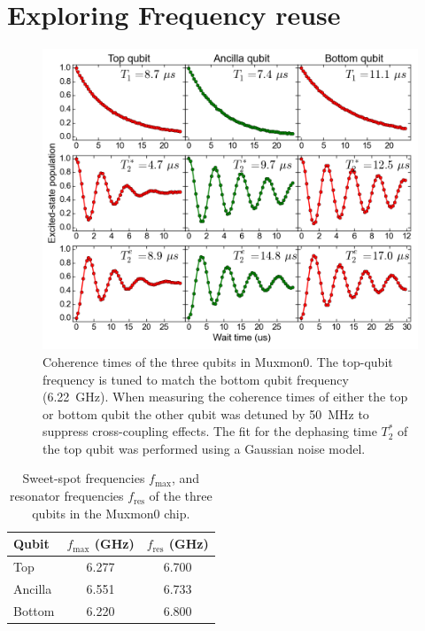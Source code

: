     \section{Exploring Frequency reuse}
      \label{sec:Exploring Frequency reuse}
      \begin{figure}[tb]
        \centering
        \includegraphics[width=\linewidth]{Figures/Exploring frequency reuse/coherence_times.png}
        \caption{Coherence times of the three qubits in Muxmon0. The top-qubit frequency is tuned to match the bottom qubit frequency (\SI{6.22}{\giga \hertz}). When measuring the coherence times of either the top or bottom qubit the other qubit was detuned by \SI{50}{\mega \hertz} to suppress cross-coupling effects. The fit for the dephasing time $T_2^*$ of the top qubit was performed using a Gaussian noise model.}
        \label{fig:coherence times Muxmon0}
      \end{figure}

      \begin{table}
        \begin{tabular}{l c c}
          \toprule
          Qubit  & $f_\text{max}$ (GHz) & $f_\text{res}$ (GHz)\\
          \midrule
          Top    & 6.277                & 6.700 \\
          Ancilla& 6.551                & 6.733 \\
          Bottom & 6.220                & 6.800 \\
          \bottomrule
        \end{tabular}
        \caption{Sweet-spot frequencies $f_\text{max}$, and resonator frequencies $f_\text{res}$ of the three qubits in the Muxmon0 chip.}
        \label{tab:Muxmon0 qubit properties}
      \end{table}

